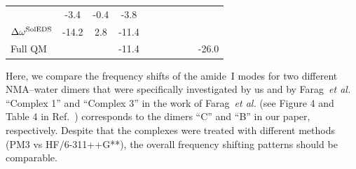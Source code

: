 \documentclass[a4paper,titlepage,twoside,fleqn,12pt]{book}
\begin{document}
\begin{refsection}
\begin{table}[t!]
\begin{tabular*}{1.0\textwidth}{@{\extracolsep{\fill} } lccccccccc}
          &  -3.4 & -0.4  &  -3.8 && & & & &       \\
 $\Delta\omega^{\rm SolEDS}$    
          & -14.2 &  2.8  & -11.4 && & & & &       \\
 Full QM  &       &       & -11.4 && & & & & -26.0 \\
%
\hline\hline
\end{tabular*}
\end{table}
%
Here, we compare the frequency shifts of the amide~I modes for two different 
NMA--water dimers that were specifically investigated by us and by Farag~\emph{et al.} 
``Complex 1'' and ``Complex 3'' in the work of Farag~\emph{et al.} 
(see Figure 4 and Table 4 in Ref.~\citep{Farag.Ruiz-Lopez.Bastida.Monard.Ingrosso.JPCB.2015}) 
corresponds to the dimers ``C'' and ``B'' 
in our paper, respectively. Despite that the complexes were treated 
with different methods (PM3 vs HF/6-311++G**), the overall frequency shifting 
patterns should be comparable. 


\end{refsection}
\end{document}
